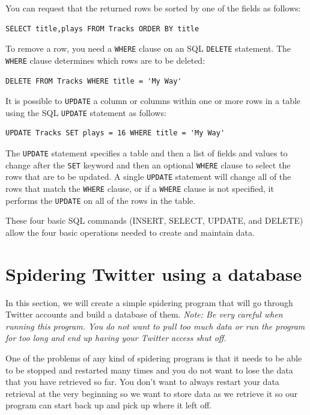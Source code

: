 \documentclass[11pt]{book}
\begin{document}
You can request that the returned rows be sorted by one of 
the fields as follows:

\beforeverb
\begin{verbatim}
SELECT title,plays FROM Tracks ORDER BY title
\end{verbatim}
\afterverb
%
To remove a row, you need a {\tt WHERE} clause on an SQL {\tt DELETE}
statement.  The {\tt WHERE} clause determines which rows are to be deleted:

\beforeverb
\begin{verbatim}
DELETE FROM Tracks WHERE title = 'My Way'
\end{verbatim}
\afterverb
%
It is possible to {\tt UPDATE} a column or columns within one or more rows
in a table using the SQL {\tt UPDATE} statement as follows:

\beforeverb
\begin{verbatim}
UPDATE Tracks SET plays = 16 WHERE title = 'My Way'
\end{verbatim}
\afterverb
%
The {\tt UPDATE} statement specifies a table and 
then a list of fields and values to change after the {\tt SET} 
keyword and then an optional {\tt WHERE} clause to select
the rows that are to be updated.  A single {\tt UPDATE} statement
will change all of the rows that match the {\tt WHERE} clause, or if 
a {\tt WHERE} clause is not specified, it performs the {\tt UPDATE}
on all of the rows in the table.

These four basic SQL commands (INSERT, SELECT, UPDATE, and DELETE) allow 
the four basic operations needed to create and maintain data.


\section{Spidering Twitter using a database}

In this section, we will create a simple spidering program that will 
go through Twitter accounts and build a database of them.
\emph{Note: Be very careful when running this program.  You do not
want to pull too much data or run the program for too long and
end up having your Twitter access shut off.}

One of the problems of any kind of spidering program is that it 
needs to be able to be stopped and restarted many times and 
you do not want to lose the data that you have retrieved so far.
You don't want to always restart your data retrieval at the
very beginning so we want to store data as we retrieve it so our
program can start back up and pick up where it left off.
\end{document}
